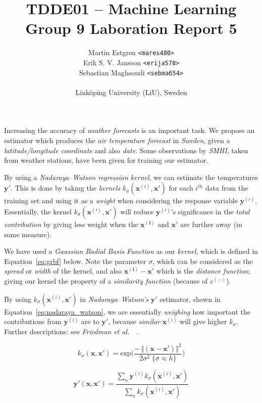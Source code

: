 \documentclass[a4paper, twocolumn]{article}
\title{TDDE01 -- Machine Learning \\
Group 9 Laboration Report 5}
\author{{Martin Estgren \texttt{<mares480>}} \\
{Erik S. V. Jansson \texttt{<erija578>}} \\
{Sebastian Maghsoudi \texttt{<sebma654>}} \\~\\
{Linköping University (LiU), Sweden}}
\begin{document}
    \maketitle %

    Increasing the accuracy of \emph{weather forecasts} is an important task. We propose an estimator which produces the \emph{air temperature forecast} in \emph{Sweden}, given a \emph{latitude/longitude coordinate} and also \emph{date}. Some observations by \emph{SMHI}, taken from weather stations, have been given for training our estimator.

    By using a \emph{Nadaraya–Watson regression kernel}, we can estimate the temperatures \(\bm{y'}\). This is done by taking the \emph{kernels} \(k_\sigma(\bm{x}^{(i)}, \bm{x'})\) for each \(i^{th}\) data from the training set and using it as a \emph{weight} when considering the response variable \(\bm{y}^{(i)}\). Essentially, the kernel \(k_\sigma(\bm{x}^{(i)}, \bm{x'})\) will reduce \(\bm{y}^{(i)}\)'s significance in the \emph{total contribution} by giving less weight when the \(\bm{x^{(i)}}\) and \(\bm{x'}\) are further away (in some measure).

    We have used a \emph{Gaussian Radial Basis Function} as our \emph{kernel}, which is defined in Equation~\ref{eq:grbf} below. Note the parameter \(\sigma\), which can be considered as the \emph{spread} or \emph{width} of the kernel, and also \(\bm{x^{(i)}} - \bm{x'}\) which is the \emph{distance function}; giving our kernel the property of a \emph{similarity function} (because of \(e^{(\cdots)}\)).

    By using \(k_\sigma(\bm{x}^{(i)}, \bm{x'})\) in \emph{Nadaraya–Watson's} \(\bm{y'}\) estimator, shown in Equation~\ref{eq:nadaraya_watson}, we are essentially \emph{weighing} how important the contributions from \(\bm{y}^{(i)}\) are to \(\bm{y'}\), because \emph{similar} \(\bm{x}^{(i)}\) will give higher \(k_\sigma\). Further descriptions: see \emph{Friedman et al.\ }~\cite{friedman2009elements}.

    \begin{equation} \label{eq:grbf}
    k_\sigma(\bm{x}, \bm{x'}) = \mathrm{exp}\bigg(\frac{- \, {\left\Vert(\bm{x} - \bm{x'}) \right\Vert}^2}
    {2\sigma^2 \; \{\sigma \approx h\}}\bigg)
    \end{equation}

    

    \begin{equation} \label{eq:nadaraya_watson}
    \bm{y'}(\bm{x}, \bm{x'}) = \frac{\sum_n{\bm{y}^{(i)}k_\sigma(\bm{x}^{(i)}, \bm{x'})}}
    {\sum_n{k_\sigma(\bm{x}^{(i)}, \bm{x'})}}
    \end{equation}
\end{document}
